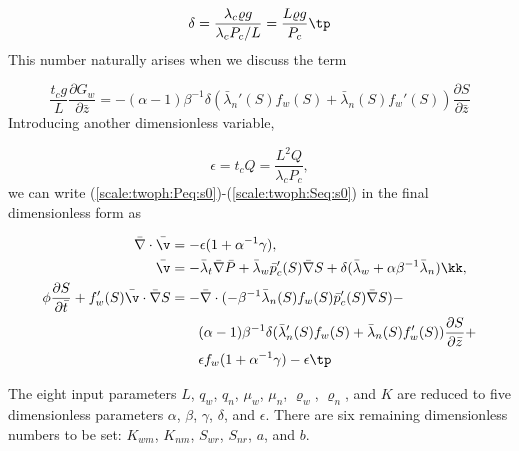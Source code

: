 \documentclass[graybox,envcountchap,sectrefs,final]{svmonodo}
\begin{document}
\[ \delta = \frac{\lambda_c \varrho g}{\lambda_c P_c/L} =
\frac{L\varrho g}{P_c}\tp\]
This number naturally arises when we discuss
the term

\[ \frac{t_c g}{L}\frac{\partial G_w}{\partial\bar z} =
-(\alpha -1)\beta^{-1}\delta
(\bar\lambda_n'(S)f_w(S) + \bar\lambda_n(S)f_w'(S))
\frac{\partial S}{\partial\bar z}
\]
Introducing another dimensionless variable,

\[ \epsilon = t_cQ = \frac{L^2Q}{\lambda_cP_c},\]
we can write (\ref{scale:twoph:Peq:s0})-(\ref{scale:twoph:Seq:s0}) in the
final dimensionless form as

\begin{align}
\bar\nabla\cdot\bar\v &= -\epsilon(1 + \alpha^{-1}\gamma),
\label{scale:twoph:Peq:s}\\ 
\bar\v &= -\bar\lambda_t\bar\nabla\bar P +
\bar\lambda_w \bar p_c'(S)\bar\nabla S +
\delta(\bar\lambda_w + \alpha\beta^{-1}\bar\lambda_n)\kk,
\label{scale:twoph:v_teq:s}\\ 
\phi\frac{\partial S}{\partial\bar t} + f_w'(S)\bar\v\cdot
\bar\nabla S &= -
\bar\nabla\cdot(-\beta^{-1}\bar\lambda_n(S)f_w(S)\bar p_c'(S)\bar\nabla S) -
\nonumber\\ 
&\quad\quad (\alpha -1)\beta^{-1}\delta
(\bar\lambda_n'(S)f_w(S) + \bar\lambda_n(S)f_w'(S))
\frac{\partial S}{\partial\bar z} +\nonumber\\ 
&\quad\quad\epsilon f_w (1+\alpha^{-1}\gamma) -
\epsilon\tp
\label{scale:twoph:Seq:s}
\end{align}

The eight input parameters $L$, $q_w$, $q_n$, $\mu_w$, $\mu_n$,
$\varrho_w$, $\varrho_n$, and $K$ are reduced to five dimensionless
parameters $\alpha$, $\beta$, $\gamma$, $\delta$, and $\epsilon$.
There are six remaining dimensionless numbers to be set: $K_{wm}$,
$K_{nm}$, $S_{wr}$, $S_{nr}$, $a$, and $b$.





\clearemptydoublepage
{}
\thispagestyle{empty}






\backmatter

\cleardoublepage{}  %
\printindex
\end{document}
